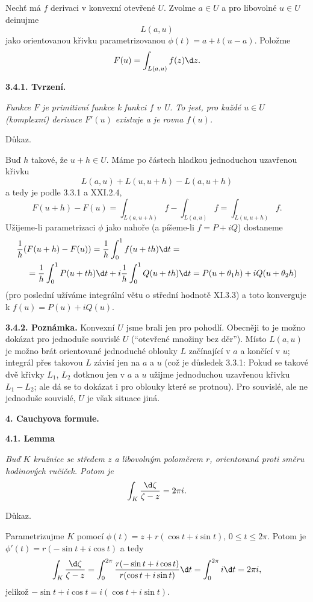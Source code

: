 \documentclass[12pt]{article}
\begin{document}
\medskip

Nechť má $f$ derivaci v konvexní otevřené $U$. Zvolme $a\in U$ a pro libovolné $u\in U$ deinujme
$$
L(a,u) 
$$
jako orientovanou křivku parametrizovanou $\phi(t)=a+t(u-a)$. Položme
$$
F(u)=\int_{L(a,u)}f(z)\d z.
$$

\medskip

{\bf 3.4.1. Tvrzení.} {\em Funkce $F$ je primitivní funkce k funkci $f$ v U. To jest, pro každé $u\in U$  (komplexní) derivace $F'(u)$ existuje a je rovna $f(u)$.

Důkaz.} Buď $h$ takové, že $u+h\in U$. Máme po částech hladkou jednoduchou uzavřenou křivku
$$
L(a,u)+L(u,u+h)-L(a,u+h)
$$
a tedy je podle 3.3.1 a XXI.2.4,
$$
F(u+h)-F(u)=\int_{L(a,u+h)}f-\int_{L(a,u)}f= \int_{L(u,u+h)}f.
$$
Užijeme-li parametrizaci $\phi$ jako nahoře (a píšeme-li $f=P+iQ$) dostaneme
$$
\begin{aligned}
\frac1h(&F(u+h)-F(u))=\frac1h\int_0^1f(u+th)\d t=\\
&=\frac1h\int_0^1P(u+th)\d t+i\frac1h\int_0^1Q(u+th)\d t=
P(u+\theta_1h)+iQ(u+\theta_2h)
\end{aligned}
$$
(pro poslední užíváme integrální větu o střední hodnotě  XI.3.3)
a toto konverguje k $f(u)=P(u)+iQ(u)$. \sq

\medskip

{\bf 3.4.2. Poznámka.} Konvexní $U$ jsme brali jen pro pohodlí.
Obecněji to je možno dokázat pro jednoduše souvislé $U$ (``otevřené množiny bez děr''). Místo $L(a,u)$ je možno brát orientované jednoduché oblouky $L$ začínající v $a$ a končící v $u$; integrál přes takovou $L$  závisí jen na $a$ a $u$  (což je důsledek 3.3.1: Pokud se takové dvě křivky
$L_1$, $L_2$ dotknou jen v $a$ a $u$ užijme jednoduchou uzavřenou křivku $L_1-L_2$; ale dá se to dokázat i pro oblouky které se protnou). Pro souvislé, ale ne jednoduše souvislé, $U$ je však situace jiná.

 \vskip10mm

 
 {\large\bf 4. Cauchyova formule.}
 
 \bigskip

{\bf 4.1. Lemma}  {\em Buď $K$ kružnice se středem $z$ a libovolným poloměrem $r$,
orientovaná proti směru hodinových ručiček. Potom je
$$
\int_K\frac{\d \zeta}{\zeta-z}= 2\pi i.
$$

Důkaz.} Parametrizujme $K$ pomocí $\phi(t)=z+r(\cos t+i\sin t)$, $0\leq t\leq 2\pi$.
Potom je $\phi'(t)=r(-\sin t+i\cos t)$ a tedy
$$
\int_K\frac{\d \zeta}{\zeta-z}=\int_0^{2\pi}\frac{r(-\sin t+i\cos t)}{r(\cos t+i\sin t)}\d t=\int_0^{2\pi}i\d t=2\pi i,
$$
jelikož $-\sin t+i\cos t=i(\cos t+i\sin t)$.\sq
\end{document}
